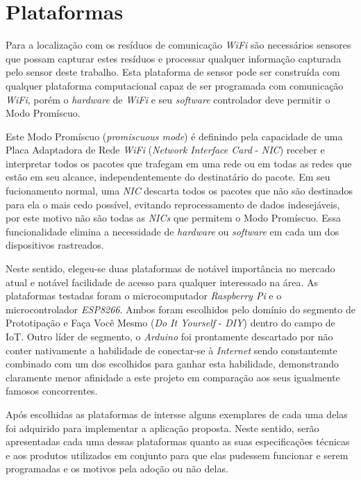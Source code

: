 \chapter{Plataformas}
\label{chap:Plataformas}

Para a localização com os resíduos de comunicação \emph{WiFi} são necessários
sensores que possam capturar estes resíduos e processar qualquer informação
capturada pelo sensor deste trabalho. Esta plataforma de sensor pode ser construída com
qualquer plataforma computacional capaz de ser programada com comunicação
\emph{WiFi}, porém o \emph{hardware} de \emph{WiFi} e seu \emph{software}
controlador deve permitir o Modo Promíscuo.

Este Modo Promíscuo (\emph{promiscuous mode}) é definindo pela capacidade de uma
Placa Adaptadora de Rede \emph{WiFi} (\emph{Network Interface Card} -
\emph{NIC}) receber e interpretar todos os pacotes que trafegam em uma rede ou
em todas as redes que estão em seu alcance, independentemente do destinatário do
pacote. Em seu fucionamento normal, uma \emph{NIC} descarta todos os pacotes que
não são destinados para ela o mais cedo possível, evitando reprocessamento de
dados indesejáveis, por este motivo não são todas as \emph{NICs} que permitem o
Modo Promíscuo. Essa funcionalidade elimina a necessidade de \emph{hardware} ou
\emph{software} em cada um dos dispositivos rastreados.

Neste sentido, elegeu-se duas plataformas de notável importância no mercado atual
e notável facilidade de acesso para qualquer interessado na área. As plataformas
testadas foram o microcomputador \emph{Raspberry Pi} e o microcontrolador
\emph{ESP8266}. Ambos  foram escolhidos pelo domínio do segmento de Prototipação
e Faça Você Mesmo  (\emph{Do It Yourself} - \emph{DIY}) dentro do campo de IoT.
Outro líder de segmento, o \emph{Arduino}  foi prontamente descartado por não
conter nativamente a habilidade de conectar-se à \emph{Internet} sendo
constantemte combinado com um dos escolhidos para ganhar esta habilidade,
demonstrando claramente menor afinidade a este projeto em comparação aos seus
igualmente famosos concorrentes.

Após escolhidas as plataformas de intersse alguns exemplares de cada uma delas
foi adquirido para implementar a aplicação proposta. Neste sentido, serão
apresentadas cada uma dessas plataformas quanto as suas especificações técnicas
e aos produtos utilizados em conjunto para que elas pudessem funcionar e serem
programadas e os motivos pela adoção ou não delas.


